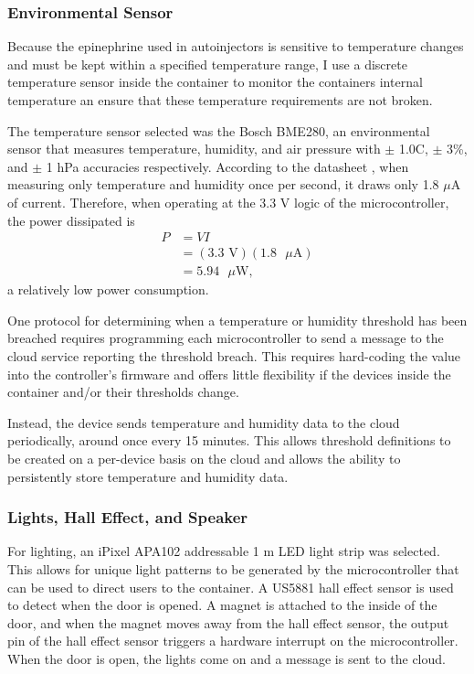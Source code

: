 \subsubsection{Environmental Sensor}

Because the epinephrine used in autoinjectors is sensitive to temperature changes and must be kept within a specified temperature range, I use a discrete temperature sensor inside the container to monitor the containers internal temperature an ensure that these temperature requirements are not broken.

The temperature sensor selected was the Bosch BME280, an environmental sensor that measures temperature, humidity, and air pressure with $\pm$ 1.0\degree C, $\pm$ 3\%, and $\pm$ 1 hPa accuracies respectively. According to the datasheet \cite{bme280}, when measuring only temperature and humidity once per second, it draws only 1.8 $\mu$A of current. Therefore, when operating at the 3.3 V logic of the microcontroller, the power dissipated is
\begin{align*}
    P &= VI \\
    &= (3.3 \text{ V})(1.8 \text{ $\mu$A}) \\
    &= 5.94 \text{ $\mu$W},
\end{align*}
a relatively low power consumption.

One protocol for determining when a temperature or humidity threshold has been breached requires programming each microcontroller to send a message to the cloud service reporting the threshold breach. This requires hard-coding the value into the controller's firmware and offers little flexibility if the devices inside the container and/or their thresholds change.

Instead, the device sends temperature and humidity data to the cloud periodically, around once every 15 minutes. This allows threshold definitions to be created on a per-device basis on the cloud and allows the ability to persistently store temperature and humidity data.

\subsubsection{Lights, Hall Effect, and Speaker}

For lighting, an iPixel APA102 addressable 1 m LED light strip was selected. This allows for unique light patterns to be generated by the microcontroller that can be used to direct users to the container. A US5881 hall effect sensor is used to detect when the door is opened. A magnet is attached to the inside of the door, and when the magnet moves away from the hall effect sensor, the output pin of the hall effect sensor triggers a hardware interrupt on the microcontroller. When the door is open, the lights come on and a message is sent to the cloud.

